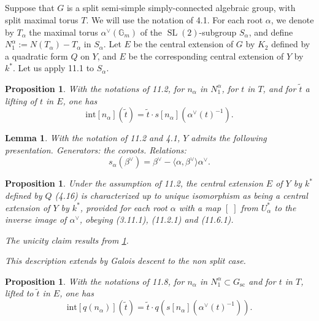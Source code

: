 \documentclass[11pt,a4paper]{article}
\theoremstyle{plain}
\newtheorem{lemma}[theorem]{Lemma}
\newtheorem{proposition}[theorem]{Proposition}
\theoremstyle{definition}
\newcommand{\Gm}{{\mathbb{G}_m}}
\newcommand{\scu}{\mathrm{sc}}
\DeclareMathOperator{\SL}{SL}
\newcommand{\intg}{\mathrm{int}}
\begin{document}
\subsection{}
Suppose that $G$ is a split semi-simple simply-connected algebraic group, with split maximal torus $T$. We will use the notation of 4.1. For each root $\alpha$, we denote by $T_\alpha$ the maximal torus $\alpha^\vee(\Gm)$ of the $\SL(2)$-subgroup $S_\alpha$, and define $N_1^\alpha := N(T_\alpha) - T_\alpha$ in $S_\alpha$. Let $E$ be the central extension of $G$ by $K_2$ defined by a quadratic form $Q$ on $Y$, and $E$ be the corresponding central extension of $Y$ by $k^*$. Let us apply 11.1 to $S_\alpha$.

\begin{proposition}\label{prop:11.3}
With the notations of 11.2, for $n_\alpha$ in $N_1^\alpha$, for $t$ in $T$, and for $\tilde{t}$ a lifting of $t$ in $E$, one has
\begin{equation}\label{eq:11.3.1}
\intg[n_\alpha](\tilde{t}) = \tilde{t} \cdot s[n_\alpha](\alpha^\vee(t)^{-1}).
\end{equation}
\end{proposition}

\begin{lemma}\label{lem:11.5}
With the notation of 11.2 and 4.1, $Y$ admits the following presentation. Generators: the coroots. Relations:
\begin{equation}\label{eq:11.5.1}
s_\alpha(\beta^\vee) = \beta^\vee - \langle \alpha, \beta^\vee \rangle \alpha^\vee.
\end{equation}
\end{lemma}

\begin{proposition}\label{prop:11.7}
Under the assumption of 11.2, the central extension $E$ of $Y$ by $k^*$ defined by $Q$ (4.16) is characterized up to unique isomorphism as being a central extension of $Y$ by $k^*$, provided for each root $\alpha$ with a map $[\;]$ from $U_\alpha^*$ to the inverse image of $\alpha^\vee$, obeying \textup{(3.11.1)}, \textup{(11.2.1)} and \textup{(11.6.1)}.

The unicity claim results from \ref{lem:11.5}.

This description extends by Galois descent to the non split case.
\end{proposition}

\begin{proposition}\label{prop:11.9}
With the notations of 11.8, for $n_\alpha$ in $N_1^\alpha \subset G_\scu$ and for $t$ in $T$, lifted to $\tilde{t}$ in $E$, one has
\begin{equation}\label{eq:11.9.1}
\intg[q(n_\alpha)](\tilde{t}) = \tilde{t} \cdot q(s[n_\alpha](\alpha^\vee(t)^{-1})).
\end{equation}
\end{proposition}
\end{document}
